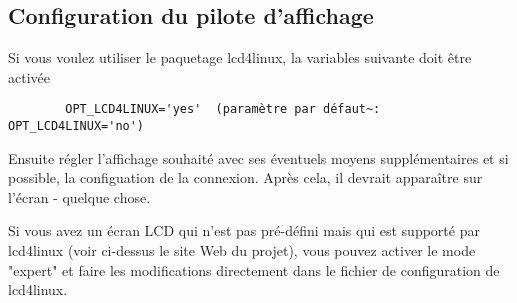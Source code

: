 \subsection{Configuration du pilote d'affichage}

    Si vous voulez utiliser le paquetage lcd4linux, la variables suivante doit
	être activée

\begin{example}
\begin{verbatim}
        OPT_LCD4LINUX='yes'  (paramètre par défaut~: OPT_LCD4LINUX='no')
\end{verbatim}
\end{example}

    Ensuite régler l'affichage souhaité avec ses éventuels moyens supplémentaires et
	si possible, la configuation de la connexion. Après cela, il devrait apparaître
	sur l'écran - quelque chose.

	Si vous avez un écran LCD qui n'est pas pré-défini mais qui est supporté par
	lcd4linux (voir ci-dessus le site Web du projet), vous pouvez activer le mode
	"expert" et faire les modifications directement dans le fichier de configuration
	de lcd4linux.

